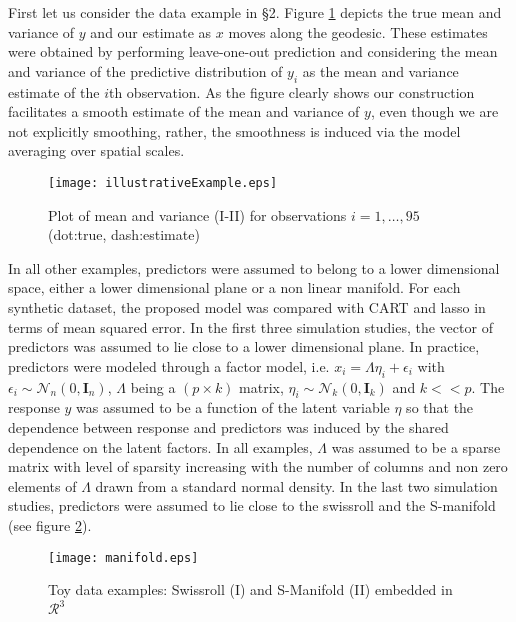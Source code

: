 \documentclass{article}
\providecommand{\mb}[1]{\boldsymbol{#1}}
\providecommand{\mc}[1]{\mathcal{#1}}
\begin{document}
First let us consider the data example in \S 2. Figure \ref{fig:wave} depicts the true mean and variance of $y$ and our estimate as $x$ moves along the geodesic. These estimates were obtained by performing leave-one-out prediction and considering the mean and variance of the predictive distribution of $y_i$ as the mean and variance estimate of the $i$th observation. As the figure clearly shows our construction facilitates a smooth estimate of the mean and variance of $y$, even though we are not explicitly smoothing, rather, the smoothness is induced via the  model averaging over spatial scales.


\begin{figure}
\centering
\texttt{[image: illustrativeExample.eps]}
\caption{ Plot of mean and variance (I-II) for observations $i=1, \ldots, 95$ (dot:true, dash:estimate)} \label{fig:wave}
\end{figure}



In all other examples, predictors were assumed to belong to a lower dimensional space, either a lower dimensional plane or a non linear manifold. For each synthetic dataset, the proposed model was compared with CART and lasso in terms of mean squared error. In the first three simulation studies, the vector of predictors was assumed to lie close to a lower dimensional plane. In practice,  predictors were modeled through a factor model, i.e. $x_i=\Lambda \eta_i + \epsilon_i$ with $\epsilon_i \sim \mc{N}_n(0,\mb{I}_n)$, $\Lambda$ being a $(p \times k)$ matrix, $\eta_i \sim \mc{N}_k(0,\mb{I}_k)$ and $k<<p$. The response $y$ was assumed to be a function of the latent variable $\eta$ so that  the dependence between response and predictors was induced by the shared dependence on the latent factors.  In all examples, $\Lambda$ was assumed to be a sparse matrix with level of sparsity increasing with the number of columns and non zero elements of $\Lambda$ drawn from a standard normal density. In the last two simulation studies, predictors were assumed to lie close to the swissroll and the S-manifold (see figure \ref{manifold}).

\begin{figure}
\centering
\texttt{[image: manifold.eps]}
\caption{Toy data examples: Swissroll (I) and S-Manifold (II) embedded in $\mathcal{R}^3$} \label{manifold}
\end{figure}
\end{document}
